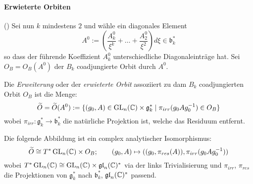 \paragraph{Erwieterte Orbiten} (\cite[pp.26-36]{thboalch})
Sei nun $k$ mindestens $2$ und wähle ein diagonales Element
\[
A^0:=\left(\frac{A_{k}^0}{\xi^{k}}+\dots+\frac{A_{2}^0}{\xi^2}\right)d\xi
\in \mathfrak b_k^*
\]
so dass der führende Koeffizient $A_k^0$ unterschiedliche Diagonaleinträge hat.
Sei $O_B=O_B(A^0)$ der $B_k$ coadjungierte Orbit durch $A^0$.
\begin{defn}
Die \emph{Erweiterung} oder der \emph{erwieterte Orbit} assoziiert zu dam $B_k$
coadjungierten Orbit $O_B$ ist die Menge:
\[
\widetilde O = \widetilde O(A^0) :=\{ (g_0,A)\in\operatorname{GL}_n(\mathbb{C})\times\mathfrak g_k^*
  \mid \pi_{irr}(g_0Ag_0^{-1})\in O_B \}
\]
wobei $\pi_{irr}:\mathfrak g_k^*\to\mathfrak b_k^*$ die natürliche Projektion
ist, welche das Residuum entfernt.
\end{defn}
\begin{comment}
Warum denn \textbf{"erwieterte"} (extended) Orbiten
\end{comment}
\begin{lem}  
Die folgende Abbildung ist ein complex analytischer Isomorphismus:
\[
\widetilde O\cong T^*\operatorname{GL}_n(\mathbb{C})\times O_B;\qquad 
  (g_0,A)\mapsto ((g_0,\pi_{res}(A)),\pi_{irr}(g_0Ag_0^{-1}))
\]
wobei $T^*\operatorname{GL}_n(\mathbb{C})\cong \operatorname{GL}_n(\mathbb{C})\times\mathfrak{gl}_n(\mathbb{C})^*$ via der links
Trivialisierung und $\pi_{irr}$, $\pi_{res}$ die Projektionen von $\mathfrak
g_k^*$ nach $\mathfrak b_k^*$, $\mathfrak{gl}_n(\mathbb{C})^*$ passend.
\end{lem}

